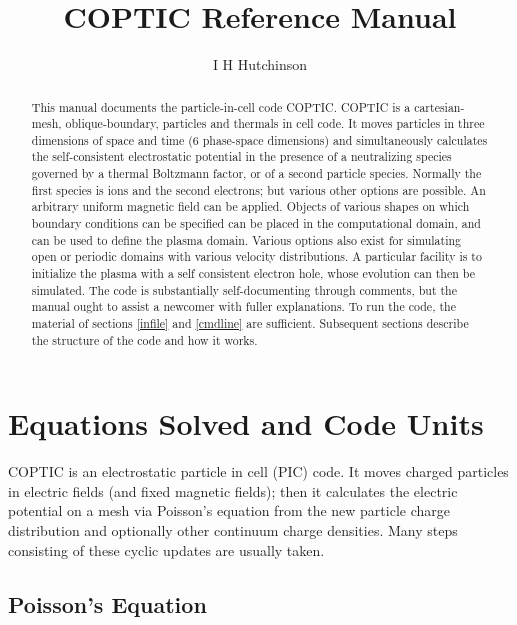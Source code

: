 \documentclass[12pt]{article}
\title{COPTIC Reference Manual}
\author{I H Hutchinson}
\begin{document}
\maketitle
\begin{abstract}
  
  This manual documents the particle-in-cell code COPTIC. COPTIC is a
  cartesian-mesh, oblique-boundary, particles and thermals in cell
  code.  It moves particles in three dimensions of space and time (6
  phase-space dimensions) and simultaneously calculates the
  self-consistent electrostatic potential in the presence of a
  neutralizing species governed by a thermal Boltzmann factor, or of a
  second particle species. Normally the first species is ions and the
  second electrons; but various other options are possible.  An
  arbitrary uniform magnetic field can be applied.  Objects of various
  shapes on which boundary conditions can be specified can be placed
  in the computational domain, and can be used to define the plasma
  domain. Various options also exist for simulating open or periodic
  domains with various velocity distributions. A particular facility
  is to initialize the plasma with a self consistent electron hole,
  whose evolution can then be simulated.  The code is substantially
  self-documenting through comments, but the manual ought to assist a
  newcomer with fuller explanations. To run the code, the material of
  sections \ref{infile} and \ref{cmdline} are sufficient. Subsequent
  sections describe the structure of the code and how it works.
\end{abstract}


\tableofcontents

\section{Equations Solved and Code Units}

COPTIC is an electrostatic particle in cell (PIC) code. It moves
charged particles in electric fields (and fixed magnetic fields); then
it calculates the electric potential on a mesh via Poisson's equation
from the new particle charge distribution and optionally other
continuum charge densities. Many steps consisting of these cyclic
updates are usually taken.

\subsection{Poisson's Equation}
\end{document}
